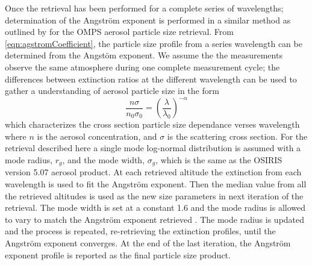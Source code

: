 \documentclass[12pt]{article}
\begin{document}
Once the retrieval has been performed for a complete series of wavelengths; determination of the Angstr\"{o}m exponent is performed in a similar method as outlined by \cite{Rault2013} for the OMPS aerosol particle size retrieval. From \autoref{eqn:agstromCoefficient}, the particle size profile from a series wavelength can be determined from the Angst\"{o}m exponent. We assume the the measurements observe the same atmosphere during one complete measurement cycle; the differences between extinction ratios at the different wavelength can be used to gather a understanding of aerosol particle size in the form
\begin{equation}
    \frac{n\sigma}{n_{0}\sigma_{0}} = \left(\frac{\lambda}{\lambda_{0}}\right)^{-\alpha}
    \label{eqn:agstromCoefficient}
\end{equation}
which characterizes the cross section particle size dependance verses wavelength where $n$ is the aerosol concentration, and $\sigma$ is the scattering cross section. For the retrieval described here a single mode log-normal distribution is assumed with a mode radius, $r_{g}$, and the mode width, $\sigma_{g}$, which is the same as the OSIRIS version 5.07 aerosol product.  At each retrieved altitude the extinction from each wavelength is used to fit the Angstr\"{o}m exponent. Then the median value from all the retrieved altitudes is used as the new size parameters in next iteration of the retrieval. The mode width is set at a constant 1.6 and the mode radius is allowed to vary to match the Angstr\"{o}m exponent retrieved \citep{Bourassa2008b, Rieger2014}. The mode radius is updated and the process is repeated, re-retrieving the extinction profiles, until the Angstr\"{o}m exponent converges. At the end of the last iteration, the Angstr\"{o}m exponent profile is reported as the final particle size product.
\end{document}
